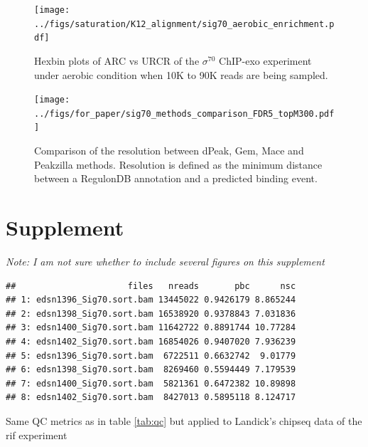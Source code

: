 \documentclass{bmcart}\usepackage[]{graphicx}\usepackage[]{color}
\makeatletter
\newenvironment{kframe}{%
 \def\at@end@of@kframe{}%
 \ifinner\ifhmode%
  \def\at@end@of@kframe{\end{minipage}}%
  \begin{minipage}{\columnwidth}%
 \fi\fi%
 \def\FrameCommand##1{\hskip\@totalleftmargin \hskip-\fboxsep
 \colorbox{shadecolor}{##1}\hskip-\fboxsep
     \hskip-\linewidth \hskip-\@totalleftmargin \hskip\columnwidth}%
 \MakeFramed {\advance\hsize-\width
   \@totalleftmargin\z@ \linewidth\hsize
   \@setminipage}}%
 {\par\unskip\endMakeFramed%
 \at@end@of@kframe}
\newenvironment{knitrout}{}{} %
\newcommand{\sig}{\sigma^{70}}
\makeatother
\begin{document}
\begin{figure}[h!]
  \centering
\texttt{[image: ../figs/saturation/K12\_alignment/sig70\_aerobic\_enrichment.pdf]}
\caption{Hexbin plots of ARC vs URCR of the $\sig$ ChIP-exo experiment
  under aerobic condition when 10K to 90K reads are being sampled.}
  \label{fig:exoQC_sat_aero}
\end{figure}

\newpage


\begin{figure}[h!]
  \centering
  \texttt{[image: ../figs/for\_paper/sig70\_methods\_comparison\_FDR5\_topM300.pdf]}
  \caption{Comparison of the resolution between dPeak, Gem, Mace and
    Peakzilla methods. Resolution is defined as the minimum distance
    between a RegulonDB annotation and a predicted binding event.}
  \label{fig:methods_comp}
\end{figure}

\newpage

\section*{Supplement}
\label{sec:supp}

\emph{Note: I am not sure whether to include several figures on this supplement}

\begin{table}[h!]
  \centering
\begin{knitrout}
\color{fgcolor}\begin{kframe}
\begin{verbatim}
##                      files   nreads       pbc      nsc
## 1: edsn1396_Sig70.sort.bam 13445022 0.9426179 8.865244
## 2: edsn1398_Sig70.sort.bam 16538920 0.9378843 7.031836
## 3: edsn1400_Sig70.sort.bam 11642722 0.8891744 10.77284
## 4: edsn1402_Sig70.sort.bam 16854026 0.9407020 7.936239
## 5: edsn1396_Sig70.sort.bam  6722511 0.6632742  9.01779
## 6: edsn1398_Sig70.sort.bam  8269460 0.5594449 7.179539
## 7: edsn1400_Sig70.sort.bam  5821361 0.6472382 10.89898
## 8: edsn1402_Sig70.sort.bam  8427013 0.5895118 8.124717
\end{verbatim}
\end{kframe}
\end{knitrout}
\caption{Same QC metrics as in table \ref{tab:qc} but applied to
  Landick's chipseq data of the rif experiment}
\end{table}
\end{document}
